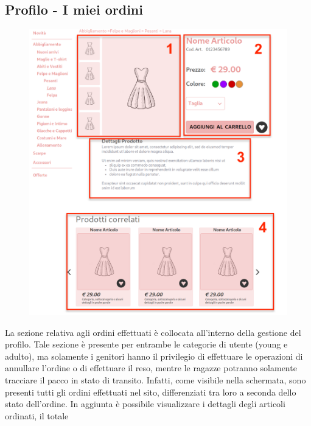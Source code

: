 \documentclass[12pt,a4paper]{report}
\begin{document}
\subsection{Profilo - I miei ordini}
\begin{figure}
\includegraphics[height=0.50\textheight]{"Images Latex/Immagini Wireframe/Desktop/7 - Dettagli Prodotto (1)"}
\vspace{-110pt}
\end{figure}
La sezione relativa agli ordini effettuati è collocata all'interno della gestione del profilo. Tale sezione è presente per entrambe le categorie di utente (young e adulto), ma solamente i genitori hanno il privilegio di effettuare le operazioni di annullare l'ordine o di effettuare il reso, mentre le ragazze potranno solamente tracciare il pacco in stato di transito. Infatti, come visibile nella schermata, sono presenti tutti gli ordini effettuati nel sito, differenziati tra loro a seconda dello stato dell'ordine. In aggiunta è possibile visualizzare i dettagli degli articoli ordinati, il totale
\end{document}
